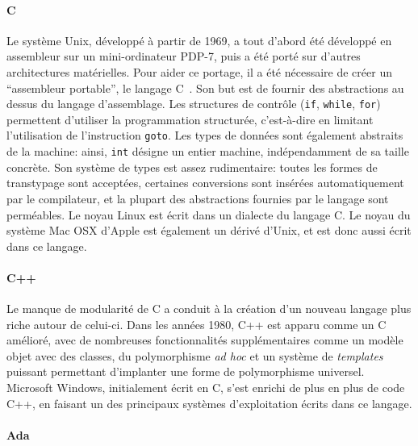 \paragraph{C}

Le système Unix, développé à partir de 1969, a tout d'abord été développé en
assembleur sur un mini-ordinateur PDP-7, puis a été porté sur d'autres
architectures matérielles. Pour aider ce portage, il a été nécessaire de créer
un ``assembleur portable'', le langage C~\cite{KandR,AnsiC}. Son but est de
fournir des abstractions au dessus du langage d'assemblage. Les structures de
contrôle (\texttt{if}, \texttt{while}, \texttt{for}) permettent d'utiliser la
programmation structurée, c'est-à-dire en limitant l'utilisation de
l'instruction \texttt{goto}. Les types de données sont également abstraits de la
machine: ainsi, \texttt{int} désigne un entier machine, indépendamment de sa
taille concrète. Son système de types est assez rudimentaire: toutes les formes
de transtypage sont acceptées, certaines conversions sont insérées
automatiquement par le compilateur, et la plupart des abstractions fournies par
le langage sont perméables. Le noyau Linux est écrit dans un dialecte du langage
C. Le noyau du système Mac OSX d'Apple est également un dérivé d'Unix, et est
donc aussi écrit dans ce langage.


\paragraph{C++}

Le manque de modularité de C a conduit à la création d'un nouveau langage plus
riche autour de celui-ci. Dans les années 1980, C++ est apparu comme un C
amélioré, avec de nombreuses fonctionnalités supplémentaires comme un modèle
objet avec des classes, du polymorphisme \emph{ad hoc} et un système de
\emph{templates} puissant permettant d'implanter une forme de polymorphisme
universel. Microsoft Windows, initialement écrit en C, s'est enrichi de plus en
plus de code C++, en faisant un des principaux systèmes d'exploitation écrits
dans ce langage.

\paragraph{Ada}

